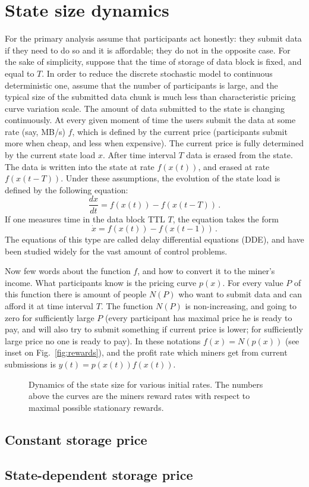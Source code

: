 \documentclass[]{llncs}   %
\newcommand{\authnote}[2]{\marginpar{\parbox{\marginparwidth}{\tiny %
  \textsf{#1 {\textcolor{blue}{notes: #2}}}}}%
  \textcolor{blue}{\textbf{\dag}}}
\newcommand{\authnote}[2]{
  \textsf{#1\textcolor{blue}{ #2}}}
\newcommand{\authnote}[2]{}
\newcommand{\knote}[1]{{\authnote{\textcolor{green}{Alex notes:}}{#1}}}
\begin{document}
\section{State size dynamics}
For the primary analysis assume that participants act honestly: they submit
data if they need to do so and it is affordable; they do not in the opposite
case. For the sake of simplicity, suppose that the time of storage of data
block is fixed, and equal to $T$. In order to reduce the discrete stochastic
model to continuous deterministic one, assume that the number of participants
is large, and the typical size of the submitted data chunk is much less than
characteristic pricing curve variation scale. The amount of data submitted to
the state is changing continuously. At every given moment of time the users
submit the data at some rate (say, MB/s) $f$, which is defined by the current
price (participants submit more when cheap, and less when expensive). The
current price is fully determined by the current state load $x$. After time
interval $T$ data is erased from the state. The data is written into the state
at rate $f(x(t))$, and erased at rate $f(x(t-T))$. Under these assumptions,
the evolution of the state load is defined by the following equation:
\begin{equation}
    \frac{dx}{dt} = f(x(t))-f(x(t-T))\,.
    \label{eq:dde0}
\end{equation}
If one measures time in the data block TTL $T$, the equation takes the form
\begin{equation}
    \dot{x} = f(x(t))-f(x(t-1))\,.
    \label{eq:dde1}
\end{equation}
The equations of this type are called delay differential equations (DDE), and have
been studied widely for the vast amount of control problems.

Now few words about the function $f$, and how to convert it to the miner's
income. What participants know is the pricing curve $p(x)$. For every value $P$
of this function there is amount of people $N(P)$ who want to submit data and
can afford it at time interval $T$. The function $N(P)$ is non-increasing, and
going to zero for sufficiently large $P$ (every participant has maximal price he
is ready to pay, and will also try to submit something if current price is
lower; for sufficiently large price no one is ready to pay). In these notations
$f(x)=N(p(x))$ (see inset on Fig.~\ref{fig:rewards}), and the profit rate which
miners get from current submissions is $y(t) = p(x(t))f(x(t))$.
\begin{figure}
    
    \caption{
        \label{fig:dynamics} Dynamics of the state size for various initial
        rates. The numbers above the curves are the miners reward rates with
        respect to maximal possible stationary rewards.
    }
\end{figure}

\subsection{Constant storage price}
\subsection{State-dependent storage price}

\knote{Scheduled Payments}
\end{document}
